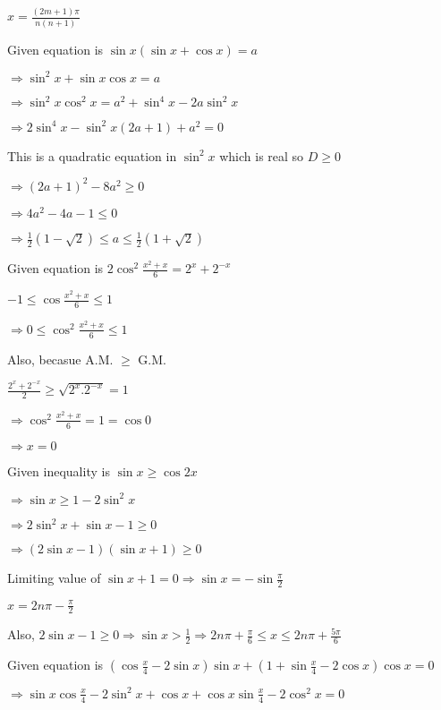   $x = \frac{(2m + 1)\pi}{n(n + 1)}$

\item Given equation is $\sin x(\sin x + \cos x) = a$

  $\Rightarrow \sin^2x + \sin x\cos x = a$

  $\Rightarrow \sin^2x\cos^2x = a^2 + \sin^4x -2a\sin^2x$

  $\Rightarrow 2\sin^4x - \sin^2x(2a + 1) + a^2 = 0$

  This is a quadratic equation in $\sin^2x$ which is real so $D\geq 0$

  $\Rightarrow (2a + 1)^2 - 8a^2 \geq 0$

  $\Rightarrow 4a^2 - 4a - 1\leq 0$

  $\Rightarrow \frac{1}{2}(1 - \sqrt{2})\leq a\leq \frac{1}{2}(1 + \sqrt{2})$

\item Given equation is $2\cos^2\frac{x^2 + x}{6} = 2^x + 2^{-x}$

  $-1 \leq \cos\frac{x^2 + x}{6} \leq 1$

  $\Rightarrow 0\leq \cos^2\frac{x^2 + x}{6}\leq 1$

  Also, becasue A.M. $\geq$ G.M.

  $\frac{2^x + 2^{-x}}{2}\geq \sqrt{2^x.2^{-x}} = 1$

  $\Rightarrow \cos^2\frac{x^2 + x}{6} = 1 = \cos 0$

  $\Rightarrow x = 0$

\item Given inequality is $\sin x\geq \cos2x$

  $\Rightarrow \sin x\geq 1 - 2\sin^2x$

  $\Rightarrow 2\sin^2x + \sin x -1 \geq 0$

  $\Rightarrow (2\sin x - 1)(\sin x + 1)\geq 0$

  Limiting value of $\sin x + 1 = 0 \Rightarrow \sin x = -\sin\frac{\pi}{2}$

  $x = 2n\pi -\frac{\pi}{2}$

  Also, $2\sin x - 1\geq 0 \Rightarrow \sin x>\frac{1}{2}\Rightarrow 2n\pi + \frac{\pi}{6}\leq x \leq 2n\pi +
  \frac{5\pi}{6}$

\item Given equation is $\left(\cos\frac{x}{4} - 2\sin x\right)\sin x + \left(1 + \sin \frac{x}{4} -2\cos x\right)\cos x = 0$

  $\Rightarrow \sin x\cos\frac{x}{4} -2\sin^2x + \cos x + \cos x\sin\frac{x}{4} - 2\cos^2x = 0$


